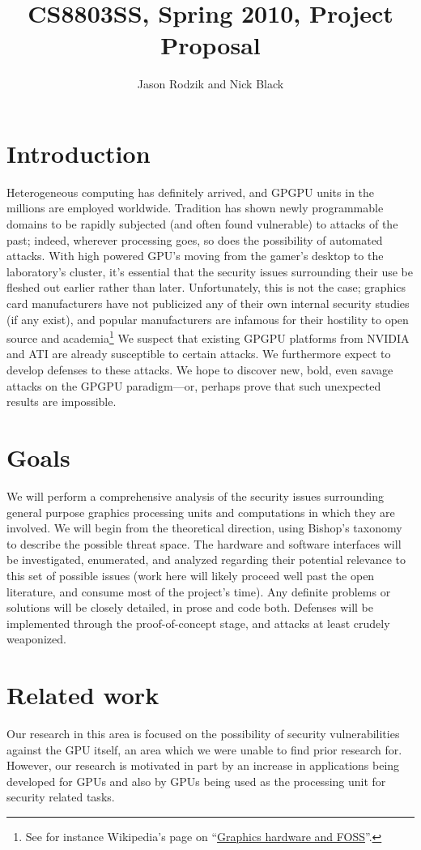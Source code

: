 \documentclass[letterpaper,10pt]{article}
\title{CS8803SS, Spring 2010, Project Proposal}
\author{
  Jason Rodzik and Nick Black
}
\date{}
\begin{document}
\maketitle

\section{Introduction}
Heterogeneous computing has definitely arrived, and GPGPU units in the millions
are employed worldwide. Tradition has shown newly programmable domains to be
rapidly subjected (and often found vulnerable) to attacks of the past; indeed,
wherever processing goes, so does the possibility of automated attacks. With
high powered GPU's moving from the gamer's desktop to the laboratory's cluster,
it's essential that the security issues surrounding their use be fleshed out
earlier rather than later. Unfortunately, this is not the case; graphics card
manufacturers have not publicized any of their own internal security studies
(if any exist), and popular manufacturers are infamous for their
hostility to open source and academia\footnote{See for instance Wikipedia's page on
``\href{http://en.wikipedia.org/wiki/NVIDIA\_and\_FOSS}{Graphics hardware and FOSS}''.}
We suspect that existing GPGPU platforms from NVIDIA and ATI are already
susceptible to certain attacks. We furthermore expect to develop defenses to
these attacks. We hope to discover new, bold, even savage attacks on
the GPGPU paradigm---or, perhaps prove that such unexpected results are impossible.

\section{Goals}
We will perform a comprehensive analysis of the security issues surrounding
general purpose graphics processing units and computations in which they are
involved. We will begin from the theoretical direction, using Bishop's taxonomy
to describe the possible threat space. The hardware and software interfaces will
be investigated, enumerated, and analyzed regarding their potential relevance
to this set of possible issues (work here will likely proceed well past the
open literature, and consume most of the project's time). Any definite problems
or solutions will be closely detailed, in prose and code both. Defenses will 
be implemented through the proof-of-concept stage, and attacks at least crudely
weaponized.

\section{Related work}
Our research in this area is focused on the possibility of security
vulnerabilities against the GPU itself, an area which we were unable to find
prior research for. However, our research is motivated in part by an increase
in applications being developed for GPUs and also by GPUs being used as the
processing unit for security related tasks.
  
\end{document}
